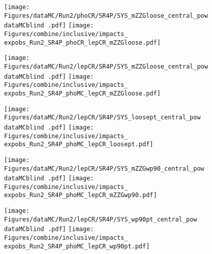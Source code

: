 \label{sec:impacts_inclusive}


\begin{figure}
  \centering
  \texttt{[image: Figures/dataMC/Run2/phoCR/SR4P/SYS\_mZZGloose\_central\_pow\\dataMCblind .pdf]}
  \hfill
  \texttt{[image: Figures/combine/inclusive/impacts\_\\expobs\_Run2\_SR4P\_phoCR\_lepCR\_mZZGloose.pdf]}
  \caption{}
  \label{fig:inclusive_cutID_phoCR_mZZGloose}
\end{figure}

\begin{figure}
  \centering
  \texttt{[image: Figures/dataMC/Run2/lepCR/SR4P/SYS\_mZZGloose\_central\_pow\\dataMCblind .pdf]}
  \hfill
  \texttt{[image: Figures/combine/inclusive/impacts\_\\expobs\_Run2\_SR4P\_phoMC\_lepCR\_mZZGloose.pdf]}
  \caption{}
  \label{fig:inclusive_cutID_phoMC_mZZGloose}
\end{figure}

\begin{figure}
  \centering
  \texttt{[image: Figures/dataMC/Run2/lepCR/SR4P/SYS\_loosept\_central\_pow\\dataMCblind .pdf]}
  \hfill
  \texttt{[image: Figures/combine/inclusive/impacts\_\\expobs\_Run2\_SR4P\_phoMC\_lepCR\_loosept.pdf]}
  \caption{}
  \label{fig:inclusive_cutID_phoMC_loosept}
\end{figure}

\begin{figure}
  \centering
  \texttt{[image: Figures/dataMC/Run2/lepCR/SR4P/SYS\_mZZGwp90\_central\_pow\\dataMCblind .pdf]}
  \hfill
  \texttt{[image: Figures/combine/inclusive/impacts\_\\expobs\_Run2\_SR4P\_phoMC\_lepCR\_mZZGwp90.pdf]}
  \caption{}
  \label{fig:inclusive_mvaID_phoMC_mZZGwp90}
\end{figure}

\begin{figure}
  \centering
  \texttt{[image: Figures/dataMC/Run2/lepCR/SR4P/SYS\_wp90pt\_central\_pow\\dataMCblind .pdf]}
  \hfill
  \texttt{[image: Figures/combine/inclusive/impacts\_\\expobs\_Run2\_SR4P\_phoMC\_lepCR\_wp90pt.pdf]}
  \caption{}
  \label{fig:inclusive_mvaID_phoMC_wp90pt}
\end{figure}

